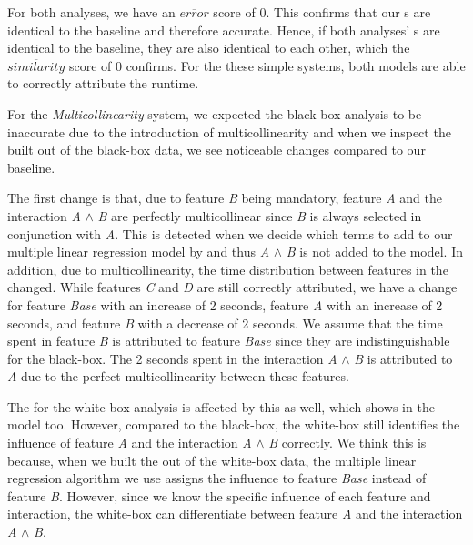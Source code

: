 For both analyses, we have an $\overline{error}$ score of $0$. This confirms that our {\perfInfluenceModel}s are identical to the baseline and
therefore accurate. Hence, if both analyses' {\perfInfluenceModel}s are identical to the baseline, they are also identical to each other,
which the $\overline{similarity}$ score of $0$ confirms. 
For the these simple systems, both models are able to correctly attribute the runtime.

For the \emph{Multicollinearity} system, we expected the black-box analysis to be inaccurate due to the introduction of multicollinearity
and when we inspect the {\perfInfluenceModel} built out of the black-box data, we see noticeable changes compared to our baseline.

The first change is that, due to feature \emph{B} being mandatory,
feature \emph{A} and the interaction \emph{A} $\land$ \emph{B} are perfectly multicollinear since \emph{B}
is always selected in conjunction with \emph{A}.
This is detected when we decide which terms to add to our multiple linear regression model by 
and thus \emph{A} $\land$ \emph{B} is not added to the model. In addition, due to multicollinearity, the time distribution between features in the
{\perfInfluenceModel} changed. While features \emph{C} and \emph{D} are still correctly attributed,
we have a change for feature \emph{Base} with an increase of 2 seconds, feature \emph{A} with an increase of 2 seconds,
and feature \emph{B} with a decrease of 2 seconds.
We assume that the time spent in feature \emph{B} is attributed to feature \emph{Base}
since they are indistinguishable for the black-box.
The 2 seconds spent in the interaction \emph{A} $\land$ \emph{B} is attributed to \emph{A} due to the perfect multicollinearity 
between these features. 

The {\perfInfluenceModel} for the white-box analysis is affected by this as well, which shows in the model too.
However, compared to the black-box, the white-box still identifies the influence of feature \emph{A} and
the interaction \emph{A} $\land$ \emph{B} correctly. We think this is because, when we built the {\perfInfluenceModel} out of the white-box data,
the multiple linear regression algorithm we use assigns the influence to feature \emph{Base} instead of feature \emph{B}.
However, since we know the specific influence of each feature and interaction,
the white-box can differentiate between feature \emph{A} and the interaction \emph{A} $\land$ \emph{B}.

